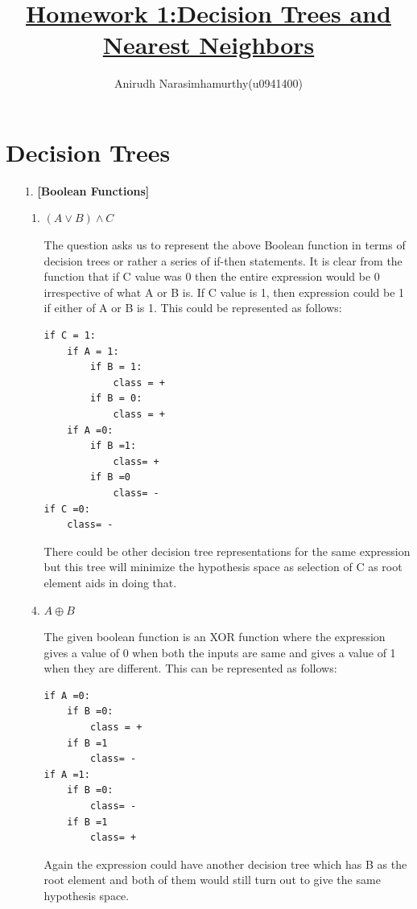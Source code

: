 \documentclass[11pt]{article}
\title{\textbf{\underline{Homework 1:Decision Trees and Nearest Neighbors}}}
\author{Anirudh Narasimhamurthy(u0941400)}
\begin{document}
	\maketitle
	
	\section{Decision Trees}
	
	\begin{enumerate}
		\item[1.] \textbf{[Boolean Functions]}
		
		\begin{enumerate}
			\item $(A \lor B) \land C$	
			
			\item[] The question asks us to represent the above Boolean function in terms of decision trees or rather a series of if-then statements. It is clear from the function that if C value was 0  then the entire expression would be 0 irrespective of what A or B is. If C value is 1, then expression could be 1 if either of A or B is 1. This could be represented as follows:
			
\begin{lstlisting}
if C = 1:
	if A = 1:
		if B = 1:
			class = +
		if B = 0:
			class = +
	if A =0:
		if B =1:
			class= +
		if B =0
			class= -
if C =0:
	class= -		
\end{lstlisting}
			
			\item[] There could be other decision tree representations for the same expression but this tree will minimize the hypothesis space as selection of C as root element aids in doing that.
			
			\item $A \oplus B$
			
			The given boolean function is an XOR function where the expression gives a value of 0 when both the inputs are same and gives a value of 1 when they are different. This can be represented as follows:
			
\begin{lstlisting}
if A =0:
	if B =0:
		class = +
	if B =1
		class= -
if A =1:
	if B =0:
		class= -
	if B =1
		class= +				
\end{lstlisting}
			
			
			\item[] Again the expression could have another decision tree which has B as the root element and both of them would still turn out to give the same hypothesis space.
			

\end{enumerate}
\end{enumerate}
\end{document}
